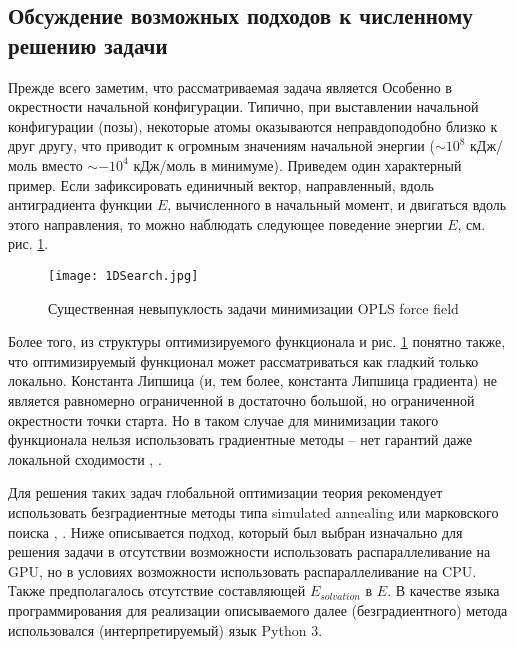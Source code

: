   \subsection{Обсуждение возможных подходов к численному решению задачи}\label{subsec:sec1/su3}

  Прежде всего заметим, что рассматриваемая задача является  Особенно в окрестности начальной конфигурации. Типично, при выставлении начальной конфигурации (позы), некоторые атомы оказываются неправдоподобно близко к друг другу, что приводит к огромным значениям начальной энергии ($\sim 10^{8}$ кДж/моль вместо $\sim -10^4$ кДж/моль в минимуме). Приведем один характерный пример. Если зафиксировать единичный вектор, направленный, вдоль антиградиента функции $E$, вычисленного в начальный момент, и двигаться вдоль этого направления, то можно наблюдать следующее поведение энергии $E$, см. рис. \ref{fig1D}.

  \begin{figure}
  \begin{center}
  \texttt{[image: 1DSearch.jpg]}
  \end{center}
   \caption{Существенная невыпуклость задачи минимизации OPLS force field}
    \label{fig1D}
   \end{figure}
   
  Более того, из структуры оптимизируемого функционала и рис. \ref{fig1D} понятно также, что оптимизируемый функционал может рассматриваться как гладкий только локально. Константа Липшица (и, тем более, константа Липшица градиента) не является равномерно ограниченной в достаточно большой, но ограниченной окрестности точки старта. Но в таком случае для минимизации такого функционала нельзя использовать градиентные методы -- нет гарантий даже локальной сходимости \cite{ghadimi2015generalized}, \cite{nesterov2017random}. 
   
  Для решения таких задач глобальной оптимизации теория рекомендует использовать безградиентные методы типа simulated annealing или марковского поиска \cite{zhigljavsky2007stochastic}, \cite{zhigljavsky2012theory}. Ниже описывается подход, который был выбран изначально для решения задачи в отсутствии возможности использовать распараллеливание на GPU, но в условиях возможности использовать распараллеливание на CPU. Также предполагалось отсутствие составляющей  $E_{solvation}$ в $E$. В качестве языка программирования для реализации описываемого далее (безградиентного) метода использовался (интерпретируемый) язык Python 3.
   
